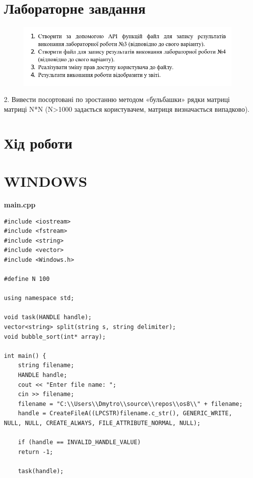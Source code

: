 \documentclass{article}
\begin{document}
\begin{normalsize}
	\section*{Лабораторне завдання}
	
	\begin{figure}[H]
		\centering
		\includegraphics[scale=0.5]{v}
	\end{figure}
	\begin{center}
		2. Вивести посортовані по зростанню методом «бульбашки» рядки
		матриці матриці N*N (N>1000 задається користувачем, матриця
		визначається випадково).
	\end{center}

	\section*{Хід роботи}	
	\section*{WINDOWS}
	\textbf{main.cpp}
	\begin{lstlisting}
#include <iostream>
#include <fstream>
#include <string>
#include <vector>
#include <Windows.h>

#define N 100

using namespace std;

void task(HANDLE handle);
vector<string> split(string s, string delimiter);
void bubble_sort(int* array);

int main() {
	string filename;
	HANDLE handle;
	cout << "Enter file name: ";
	cin >> filename;
	filename = "C:\\Users\\Dmytro\\source\\repos\\os8\\" + filename;
	handle = CreateFileA((LPCSTR)filename.c_str(), GENERIC_WRITE, NULL, NULL, CREATE_ALWAYS, FILE_ATTRIBUTE_NORMAL, NULL);
	
	if (handle == INVALID_HANDLE_VALUE)
	return -1;
	
	task(handle);
	

\end{lstlisting}
\end{normalsize}
\end{document}
